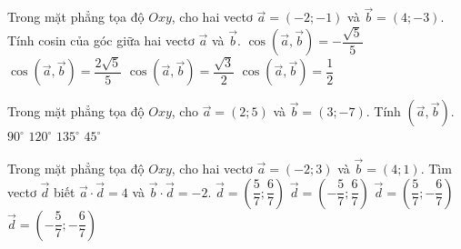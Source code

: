 \begin{ex}%
	Trong mặt phẳng tọa độ $Oxy$, cho hai vectơ $\overrightarrow{a}=\left(-2;-1\right)$ và $\overrightarrow{b}=\left(4;-3\right)$. Tính cosin của góc giữa hai vectơ $\overrightarrow{a}$ và $\overrightarrow{b}$.
	\choice
	{\True $\cos\left(\overrightarrow{a},\overrightarrow{b}\right)=-\dfrac{\sqrt{5}}{5}$}
	{$\cos\left(\overrightarrow{a},\overrightarrow{b}\right)=\dfrac{2\sqrt{5}}{5}$}
	{$\cos\left(\overrightarrow{a},\overrightarrow{b}\right)=\dfrac{\sqrt{3}}{2}$}
	{$\cos\left(\overrightarrow{a},\overrightarrow{b}\right)=\dfrac{1}{2}$}
\end{ex}
\begin{ex}%
	Trong mặt phẳng tọa độ $Oxy$, cho $\overrightarrow{a}=(2;5)$ và $\overrightarrow{b}=(3;-7)$. Tính $\left(\overrightarrow{a},\overrightarrow{b}\right)$.
	\choice
	{$90^{\circ}$}
	{$120^{\circ}$}
	{\True $135^{\circ}$}
	{$45^{\circ}$}
\end{ex}

\begin{ex}%
	Trong mặt phẳng tọa độ $Oxy$, cho hai vectơ $\overrightarrow{a}=\left(-2;3\right)$ và $\overrightarrow{b}=\left(4;1\right)$. Tìm vectơ $\overrightarrow{d} $ biết $\overrightarrow{a} \cdot \overrightarrow{d}=4$ và $\overrightarrow{b} \cdot \overrightarrow{d}=-2$.
	\choice
	{$\overrightarrow{d}=\left(\dfrac{5}{7};\dfrac{6}{7}\right)$}
	{\True $\overrightarrow{d}=\left(-\dfrac{5}{7};\dfrac{6}{7}\right)$}
	{$\overrightarrow{d}=\left(\dfrac{5}{7};-\dfrac{6}{7}\right)$}
	{$\overrightarrow{d}=\left(-\dfrac{5}{7};-\dfrac{6}{7}\right)$}
\end{ex}


